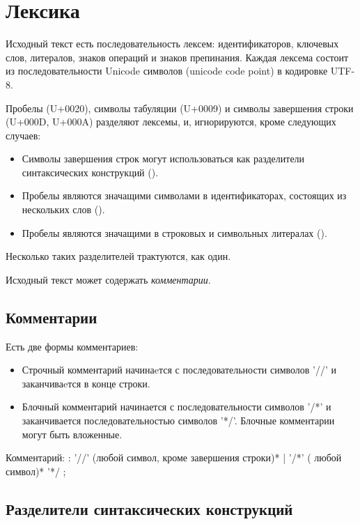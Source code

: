 \hypertarget{lexica}{%
\section{Лексика}\label{lex:chapter}}

Исходный текст есть последовательность лексем: идентификаторов, ключевых слов, литералов, знаков операций и знаков препинания. 
Каждая лексема состоит из последовательности Unicode символов (unicode code point) в кодировке UTF-8.

Пробелы (U+0020), символы табуляции (U+0009) и символы завершения строки (U+000D, U+000A) разделяют лексемы, и, игнорируются, кроме следующих случаев:
\begin{itemize}
\item
Символы завершения строк могут использоваться как разделители синтаксических конструкций ().
\item
  Пробелы являются значащими символами в идентификаторах, состоящих из нескольких слов (). 
\item
  Пробелы являются значащими в строковых и символьных литералах (). 
\end{itemize}

Несколько таких разделителей трактуются, как один.

Исходный текст может содержать \emph{комментарии}.

\hypertarget{comments}{%
\subsection{Комментарии}\label{lex:comments}}

Есть две формы комментариев:
\begin{itemize}
\item
Строчный комментарий начинаeтся с последовательности символов '//' и заканчиваeтся в конце строки.
\item
Блочный комментарий начинается с последовательности символов '/*' и заканчивается последовательностью символов '*/'. 
Блочные комментарии могут быть вложенные.
\end{itemize}

\begin{Grammar}
Комментарий: 
    : '//' (любой символ, кроме завершения строки)*
    | '/*'  ( любой символ)* '*/
    ;
\end{Grammar}

\hypertarget{separators}{%
\subsection{Разделители синтаксических конструкций}\label{lex:separators}}

